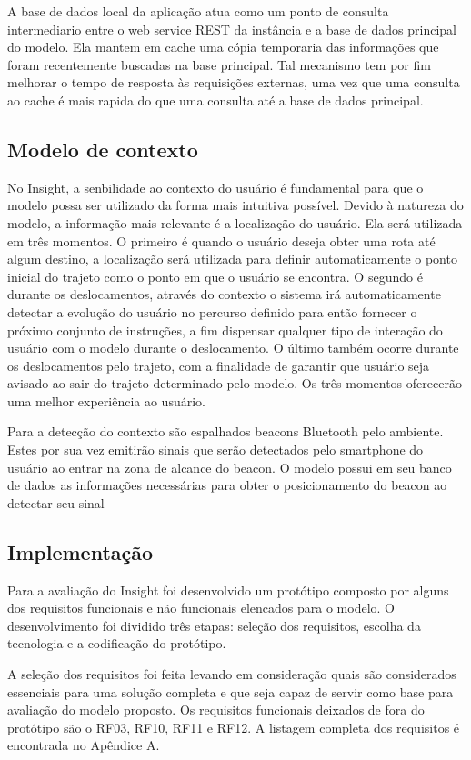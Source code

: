 \documentclass[twoside,english,brazilian]{UNISINOSartigo}
\begin{document}
A base de dados local da aplicação atua como um ponto de consulta intermediario entre o web service REST da instância e a base de dados principal do modelo. Ela mantem em cache uma cópia temporaria das informações que foram recentemente buscadas na base principal. Tal mecanismo tem por fim melhorar o tempo de resposta às requisições externas, uma vez que uma consulta ao cache é mais rapida do que uma consulta até a base de dados principal.

\subsection{Modelo de contexto}
No Insight, a senbilidade ao contexto do usuário é fundamental para que o modelo possa ser utilizado da forma mais intuitiva possível. Devido à natureza do modelo, a informação mais relevante é a localização do usuário. Ela será utilizada em três momentos. O primeiro é quando o usuário deseja obter uma rota até algum destino, a localização será utilizada para definir automaticamente o ponto inicial do trajeto como o ponto em que o usuário se encontra. O segundo é durante os deslocamentos, através do contexto o sistema irá automaticamente detectar a evolução do usuário no percurso definido para então fornecer o próximo conjunto de instruções, a fim dispensar qualquer tipo de interação do usuário com o modelo durante o deslocamento. O último também ocorre durante os deslocamentos pelo trajeto, com a finalidade de garantir que usuário seja avisado ao sair do trajeto determinado pelo modelo. Os três momentos oferecerão uma melhor experiência ao usuário.

Para a detecção do contexto são espalhados beacons Bluetooth pelo ambiente. Estes por sua vez emitirão sinais que serão detectados pelo smartphone do usuário ao entrar na zona de alcance do beacon. O modelo possui em seu banco de dados as informações necessárias para obter o posicionamento do beacon ao detectar seu sinal


\subsection{Implementação}
Para a avaliação do Insight foi desenvolvido um protótipo composto por alguns dos requisitos funcionais e não funcionais elencados para o modelo. O desenvolvimento foi dividido três etapas: seleção dos requisitos, escolha da tecnologia e a codificação do protótipo.

A seleção dos requisitos foi feita levando em consideração quais são considerados essenciais para uma solução completa e que seja capaz de servir como base para avaliação do modelo proposto. Os requisitos funcionais deixados de fora do protótipo são o RF03, RF10, RF11 e RF12. A listagem completa dos requisitos é encontrada no Apêndice A.
\end{document}
